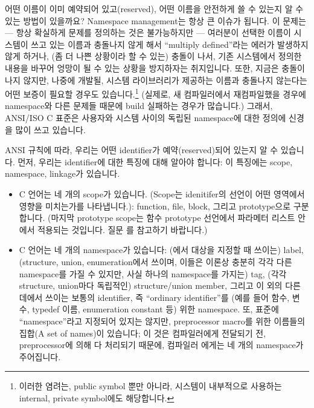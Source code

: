 \begin{faq}
        어떤 이름이 이미 예약되어 있고(reserved), 
        어떤 이름을 안전하게 쓸 수 있는지
        알 수 있는 방법이 있을까요?
\A
	Namespace management는 항상 큰 이슈가 됩니다. 이 문제는
        --- 항상 확실하게 문제를 정의하는 것은 불가능하지만 ---
        여러분이 선택한 이름이 시스템이 쓰고 있는 이름과 충돌나지 않게
        해서 ``multiply defined''라는 에러가 발생하지 않게 하거나,
        (좀 더 나쁜 상황이라 할 수 있는) 충돌이 나서, 기존 시스템에서
        정의한 내용을 바꾸어 엉망이 될 수 있는 상황을 방지하자는 취지입니다.
        또한, 지금은 충돌이 나지 않지만, 나중에 개발될, 시스템 라이브러리가
        제공하는 이름과 충돌나지 않는다는 어떤 보증이 필요할 경우도
        있습니다.\footnote{이러한 염려는, public symbol 뿐만 아니라,
          시스템이 내부적으로 사용하는 internal, private symbol에도
          해당합니다.}
        (실제로, 새 컴파일러에서 재컴파일했을 경우에 namespace와 다른
        문제들 때문에 build 실패하는 경우가 많습니다.)
        그래서, ANSI/ISO C 표준은 사용자와 시스템 사이의 독립된
        namespace에 대한 정의에 신경을 많이 쓰고 있습니다.

        ANSI 규칙에 따라, 우리는 어떤 identifier가 예약(reserved)되어
        있는지 알 수 있습니다. 먼저, 우리는 identifier에 대한 특징에 대해
        알아야 합니다: 이 특징에는 scope, namespace, linkage가 있습니다.

        \begin{itemize}
          \item C 언어는 네 개의 scope가 있습니다. (Scope는 idenitifer의 선언이
            어떤 영역에서 영향을 미치는가를 나타냅니다.):
            function, file, block, 그리고 prototype으로 구분합니다.
            (마지막 prototype scope는 함수 prototype 선언에서 파라메터
            리스트 안에서 적용되는 것입니다. 질문 를 참고하기
            바랍니다.)

          \item C 언어는 네 개의 namespace가 있습니다: (에서
            대상을 지정할 때 쓰이는) label, (structure, union, enumeration에서
            쓰이며, 이들은 이론상 충분히 각각 다른 namespace를 가질 수
            있지만, 사실 하나의 namespace를 가지는) tag, (각각 structure,
            union마다 독립적인) structure/union member, 그리고
            이 외의 다른 데에서 쓰이는 보통의 identifier, 즉 ``ordinary
            identifier''를 (예를 들어 함수, 변수, typedef
            이름, enumeration constant 등) 위한 namespace. 또, 표준에
            ``namespace''라고 지정되어 있지는 않지만, preprocessor macro를
            위한 이름들의 집합(A set of names)이 있습니다; 이 것은 컴파일러에게
            전달되기 전, preprocessor에 의해 다 처리되기 때문에, 컴파일러
            에게는 네 개의 namespace가 주어집니다.


\end{itemize}
\end{faq}
